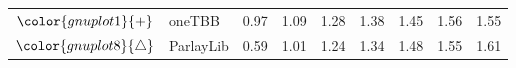 \begin{tabular}{clrrrrrrr}
\rowcolor{gnuplot1!10}$\color{gnuplot1}{+}$ & oneTBB & \cellcolor{gnuplot1!10} 0.97 & \cellcolor{gnuplot1!10} 1.09 & \cellcolor{gnuplot1!10} 1.28 & \cellcolor{gnuplot1!10} 1.38 & \cellcolor{gnuplot1!10} 1.45 & \cellcolor{gnuplot1!10} 1.56 & \cellcolor{gnuplot1!10} 1.55 \\
\rowcolor{gnuplot8!10}$\color{gnuplot8}{\triangle}$ & ParlayLib & \cellcolor{gnuplot8!10} 0.59 & \cellcolor{gnuplot8!10} 1.01 & \cellcolor{gnuplot8!10} 1.24 & \cellcolor{gnuplot8!10} 1.34 & \cellcolor{gnuplot8!10} 1.48 & \cellcolor{gnuplot8!10} 1.55 & \cellcolor{gnuplot8!10} 1.61 \\
\bottomrule
\end{tabular}

